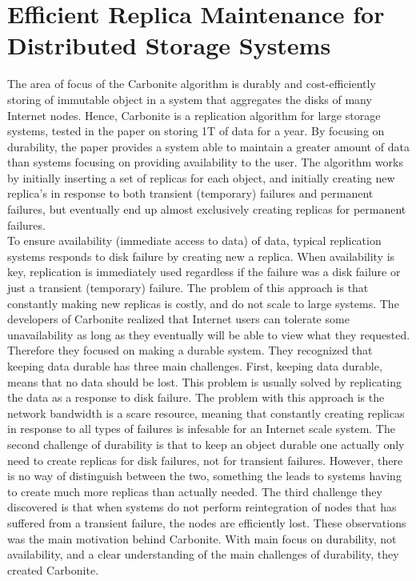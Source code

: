\documentclass{article}
\begin{document}
\section*{Efficient Replica Maintenance for Distributed Storage Systems}

The area of focus of the Carbonite algorithm is durably and cost-efficiently storing of immutable object in a system that aggregates the disks of many Internet nodes. Hence, Carbonite is a replication algorithm for large storage systems, tested in the paper on storing 1T of data for a year. By focusing on durability, the paper provides a system able to maintain a greater amount of data than systems focusing on providing availability to the user. The algorithm works by initially inserting a set of replicas for each object, and initially creating new replica's in response to both transient (temporary) failures and permanent failures, but eventually end up almost exclusively creating replicas for permanent failures. \\

\noindent To ensure availability (immediate access to data) of data, typical replication systems responds to disk failure by creating new a replica. When availability is key, replication is immediately used regardless if the failure was a disk failure or just a transient (temporary) failure. The problem of this approach is that constantly making new replicas is costly, and do not scale to large systems. The developers of Carbonite realized that Internet users can tolerate some unavailability as long as they eventually will be able to view what they requested. Therefore they focused on making a durable system. They recognized that keeping data durable has three main challenges. First, keeping data durable, means that no data should be lost. This problem is usually solved by replicating the data as a response to disk failure. The problem with this approach is the network bandwidth is a scare resource, meaning that constantly creating replicas in response to all types of failures is infesable for an Internet scale system. The second challenge of durability is that to keep an object durable one actually only need to create replicas for disk failures, not for transient failures. However, there is no way of distinguish between the two, something the leads to systems having to create much more replicas than actually needed. The third challenge they discovered is that when systems do not perform reintegration of nodes that has suffered from a transient failure, the nodes are efficiently lost. These observations was the main motivation behind Carbonite. With main focus on durability, not availability, and a clear understanding of the main challenges of durability, they created Carbonite.\\
\end{document}
